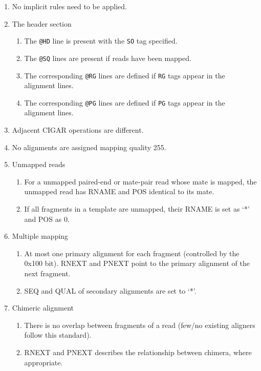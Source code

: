 \documentclass[10pt]{article}
\begin{document}
\begin{enumerate}
\item No implicit rules need to be applied.
\item The header section
  \begin{enumerate}[label*=\arabic*]
  \item The {\tt @HD} line is present with the {\tt SO} tag specified.
  \item The {\tt @SQ} lines are present if reads have been mapped.
  \item The corresponding {\tt @RG} lines are defined if {\tt RG} tags
    appear in the alignment lines.
  \item The corresponding {\tt @PG} lines are defined if {\tt PG} tags
    appear in the alignment lines.
  \end{enumerate}
\item Adjacent CIGAR operations are different.
\item No alignments are assigned mapping quality 255.
\item Unmapped reads
  \begin{enumerate}[label*=\arabic*]
  \item For a unmapped paired-end or mate-pair read whose mate is
    mapped, the unmapped read has {\sf RNAME} and {\sf POS} identical to
    its mate.
  \item If all fragments in a template are unmapped, their {\sf RNAME}
    is set as `*' and {\sf POS} as 0.
  \end{enumerate}
\item Multiple mapping
  \begin{enumerate}[label*=\arabic*]
  \item At most one primary alignment for each fragment (controlled
    by the 0x100 bit). {\sf RNEXT} and {\sf PNEXT} point to the primary
    alignment of the next fragment.
  \item {\sf SEQ} and {\sf QUAL} of secondary alignments are set to `*'.
  \end{enumerate}
\item Chimeric alignment
  \begin{enumerate}[label*=\arabic*]
  \item There is no overlap between fragments of a read (few/no existing
    aligners follow this standard).
  \item {\sf RNEXT} and {\sf PNEXT} describes the relationship between
    chimera, where appropriate.
  \end{enumerate}  
\end{enumerate}
\end{document}
